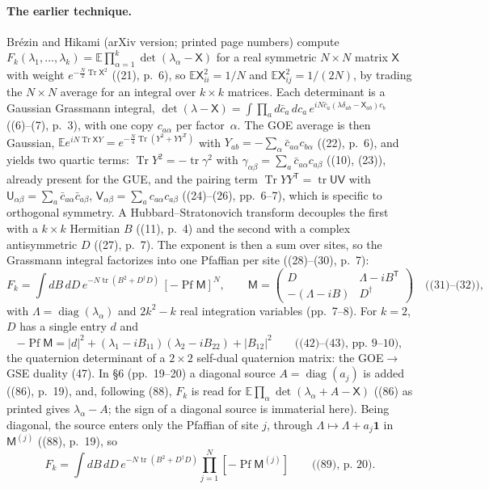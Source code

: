 \documentclass[11pt]{article}
\newcommand{\E}{\mathbb{E}}
\newcommand{\one}{\mathbf{1}}
\begin{document}
\paragraph{The earlier technique.}
Br\'ezin and Hikami \cite{BrezinHikami2001-CharPolyRealSymmetric} (arXiv
version; printed page numbers) compute
$F_k(\lambda_1,\dots,\lambda_k)=\E\prod_{\alpha=1}^k\det(\lambda_\alpha-\mathsf X)$
for a real symmetric $N\times N$ matrix $\mathsf X$ with weight
$e^{-\frac N2\operatorname{Tr}\mathsf X^2}$ ((21), p.~6), so
$\E\mathsf X_{ii}^2=1/N$ and $\E\mathsf X_{ij}^2=1/(2N)$, by trading the
$N\times N$ average for an integral over $k\times k$ matrices. Each determinant
is a Gaussian Grassmann integral,
$\det(\lambda-\mathsf X)=\int\prod_ad\bar c_a\,dc_a\,
e^{iN\bar c_a(\lambda\delta_{ab}-\mathsf X_{ab})c_b}$ ((6)--(7), p.~3), with
one copy $c_{a\alpha}$ per factor~$\alpha$. The GOE average is then Gaussian,
$\E e^{iN\operatorname{Tr}\mathsf XY}=e^{-\frac N4\operatorname{Tr}(Y^2+YY^{\mathsf T})}$
with $Y_{ab}=-\sum_\alpha\bar c_{a\alpha}c_{b\alpha}$ ((22), p.~6), and yields
two quartic terms: $\operatorname{Tr}Y^2=-\operatorname{tr}\gamma^2$ with
$\gamma_{\alpha\beta}=\sum_a\bar c_{a\alpha}c_{a\beta}$ ((10), (23)), already
present for the GUE, and the pairing term
$\operatorname{Tr}YY^{\mathsf T}=\operatorname{tr}\mathsf U\mathsf V$ with
$\mathsf U_{\alpha\beta}=\sum_a\bar c_{a\alpha}\bar c_{a\beta}$,
$\mathsf V_{\alpha\beta}=\sum_ac_{a\alpha}c_{a\beta}$ ((24)--(26), pp.~6--7),
which is specific to orthogonal symmetry. A Hubbard--Stratonovich transform
decouples the first with a $k\times k$ Hermitian $B$ ((11), p.~4) and the
second with a complex antisymmetric $D$ ((27), p.~7). The exponent is then a
sum over sites, so the Grassmann integral factorizes into one Pfaffian per
site ((28)--(30), p.~7):
\[
 F_k=\int dB\,dD\,e^{-N\operatorname{tr}(B^2+D^\dagger D)}\,[-\operatorname{Pf}\mathsf M]^N,
 \qquad
 \mathsf M=\begin{pmatrix}D&\Lambda-iB^{\mathsf T}\\-(\Lambda-iB)&D^\dagger\end{pmatrix}
 \quad\text{((31)--(32))},
\]
with $\Lambda=\operatorname{diag}(\lambda_\alpha)$ and $2k^2-k$ real
integration variables (pp.~7--8). For $k=2$, $D$ has a single entry $d$ and
\[
 -\operatorname{Pf}\mathsf M=|d|^2+(\lambda_1-iB_{11})(\lambda_2-iB_{22})+|B_{12}|^2
 \qquad\text{((42)--(43), pp.~9--10)},
\]
the quaternion determinant of a $2\times2$ self-dual quaternion matrix: the
GOE$\to$GSE duality (47). In \S6 (pp.~19--20) a diagonal source
$A=\operatorname{diag}(a_j)$ is added ((86), p.~19), and, following (88),
$F_k$ is read for $\E\prod_\alpha\det(\lambda_\alpha+A-\mathsf X)$ ((86) as
printed gives $\lambda_\alpha-A$; the sign of a diagonal source is immaterial
here). Being diagonal, the source
enters only the Pfaffian of site $j$, through $\Lambda\mapsto\Lambda+a_j\one$
in $\mathsf M^{(j)}$ ((88), p.~19), so
\[
 F_k=\int dB\,dD\,e^{-N\operatorname{tr}(B^2+D^\dagger D)}\prod_{j=1}^N[-\operatorname{Pf}\mathsf M^{(j)}]
 \qquad\text{((89), p.~20)}.
\]
\end{document}
